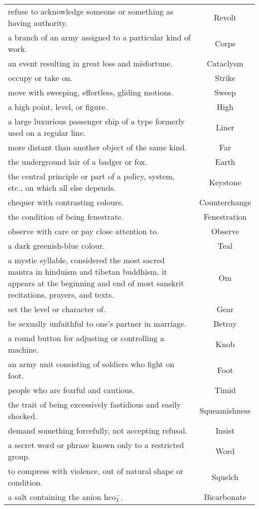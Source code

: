 \documentclass{article}
\begin{document}
\begin{longtable}{p{12cm}c}
refuse to acknowledge someone or something as having authority. & Revolt\\
a branch of an army assigned to a particular kind of work. & Corps\\
an event resulting in great loss and misfortune. & Cataclysm\\
occupy or take on. & Strike\\
move with sweeping, effortless, gliding motions. & Sweep\\
a high point, level, or figure. & High\\
a large luxurious passenger ship of a type formerly used on a regular line. & Liner\\
more distant than another object of the same kind. & Far\\
the underground lair of a badger or fox. & Earth\\
the central principle or part of a policy, system, etc., on which all else depends. & Keystone\\
chequer with contrasting colours. & Counterchange\\
the condition of being fenestrate. & Fenestration\\
observe with care or pay close attention to. & Observe\\
a dark greenish-blue colour. & Teal\\
a mystic syllable, considered the most sacred mantra in hinduism and tibetan buddhism. it appears at the beginning and end of most sanskrit recitations, prayers, and texts. & Om\\
set the level or character of. & Gear\\
be sexually unfaithful to one's partner in marriage. & Betray\\
a round button for adjusting or controlling a machine. & Knob\\
an army unit consisting of soldiers who fight on foot. & Foot\\
people who are fearful and cautious. & Timid\\
the trait of being excessively fastidious and easily shocked. & Squeamishness\\
demand something forcefully, not accepting refusal. & Insist\\
a secret word or phrase known only to a restricted group. & Word\\
to compress with violence, out of natural shape or condition. & Squelch\\
a salt containing the anion hco$_3^-$. & Bicarbonate\\

\end{longtable}
\end{document}
